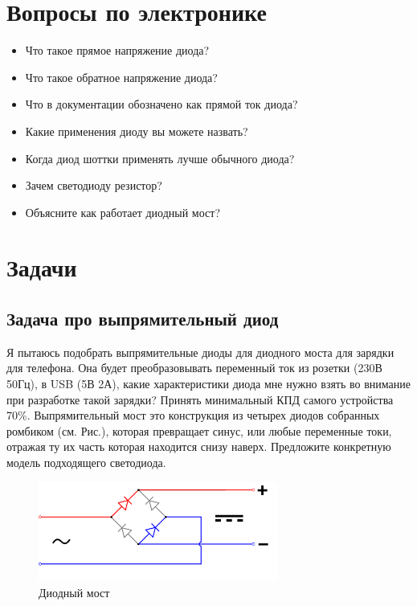 \documentclass[a4paper,12pt]{article} %
\begin{document}
\section{Вопросы по электронике}

\begin{itemize}
  \item Что такое прямое напряжение диода?
  \item Что такое обратное напряжение диода?
  \item Что в документации обозначено как прямой ток диода?
  \item Какие применения диоду вы можете назвать?
  \item Когда диод шоттки применять лучше обычного диода?
  \item Зачем светодиоду резистор?
  \item Объясните как работает диодный мост?
\end{itemize}

\section{Задачи}
  \subsection{Задача про выпрямительный диод}
Я пытаюсь подобрать выпрямительные диоды для диодного моста для зарядки для телефона. Она будет преобразовывать переменный ток из розетки (230В 50Гц), в USB (5В 2А), какие характеристики диода мне нужно взять во внимание при разработке такой зарядки? Принять минимальный КПД самого устройства 70\%. Выпрямительный мост это конструкция из четырех диодов собранных ромбиком (см. Рис.), которая превращает синус, или любые переменные токи, отражая ту их часть которая находится снизу наверх. Предложите конкретную модель подходящего светодиода.
\begin{figure}[H]
\centering
\includegraphics[width=0.7\textwidth]{bridge.png}
\caption{Диодный мост}
\end{figure}
\end{document}
